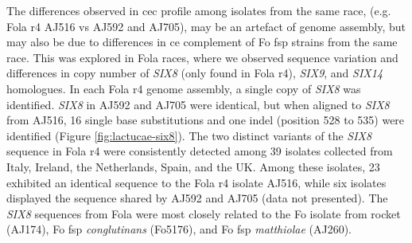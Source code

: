 The differences observed in \ac{cec} profile among isolates from the same race, (e.g. \ac{Fola} \ac{r4} AJ516 vs AJ592 and AJ705), may be an artefact of genome assembly, but may also be due to differences in \ac{ce} complement of \ac{Fo} \ac{fsp} strains from the same race. This was explored in  \ac{Fola} races, where we observed sequence variation and differences in copy number of \textit{SIX8} (only found in \ac{Fola} \ac{r4}), \textit{SIX9}, and \textit{SIX14} homologues. In each \ac{Fola} \ac{r4} genome assembly, a single copy of \textit{SIX8} was identified. \textit{SIX8} in AJ592 and AJ705 were identical, but when aligned to \textit{SIX8} from AJ516, 16 single base substitutions and one indel (position 528 to 535) were identified (Figure \ref{fig:lactucae-six8}). The two distinct variants of the \textit{SIX8} sequence in \ac{Fola} \ac{r4} were consistently detected among 39 isolates collected from Italy, Ireland, the Netherlands, Spain, and the UK. Among these isolates, 23 exhibited an identical sequence to the \ac{Fola} \ac{r4} isolate AJ516, while six isolates displayed the sequence shared by AJ592 and AJ705 (data not presented). The \textit{SIX8} sequences from \ac{Fola} were  most closely related to the \ac{Fo} isolate from rocket (AJ174), \ac{Fo} \ac{fsp} \textit{conglutinans} (Fo5176), and \ac{Fo} \ac{fsp} \textit{matthiolae} (AJ260).

